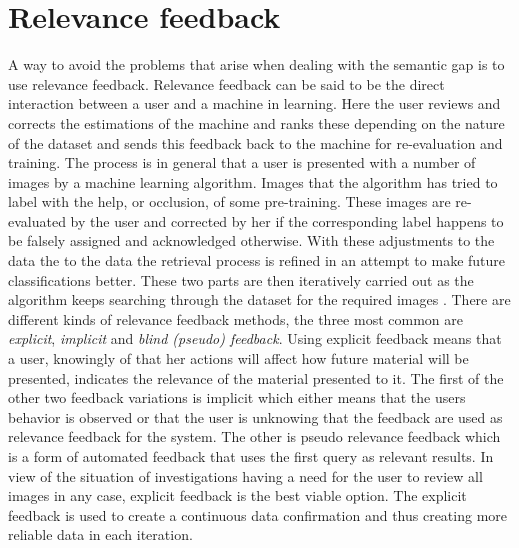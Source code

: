 \section{Relevance feedback}
\label{sec:theory:relfeed}
A way to avoid the problems that arise when dealing with the semantic gap is to use relevance feedback. Relevance feedback can be said to be the direct interaction between a user and a machine in learning. Here the user reviews and corrects the estimations of the machine and ranks these depending on the nature of the dataset and sends this feedback back to the machine for re-evaluation and training. The process is in general that a user is presented with a number of images by a machine learning algorithm. Images that the algorithm has tried to label with the help, or occlusion, of some pre-training. These images are re-evaluated by the user and corrected by her if the corresponding label happens to be falsely assigned and acknowledged otherwise. With these adjustments to the data the to the data the retrieval process is refined in an attempt to make future classifications better. These two parts are then iteratively carried out as the algorithm keeps searching through the dataset for the required images \cite{IRJET2017relevancefeedback}. There are different kinds of relevance feedback methods, the three most common are \emph{explicit}, \emph{implicit} and \emph{blind (pseudo) feedback}. Using explicit feedback means that a user, knowingly of that her actions will affect how future material will be presented, indicates the relevance of the material presented to it. The first of the other two feedback variations is implicit which either means that the users behavior is observed or that the user is unknowing that the feedback are used as relevance feedback for the system. The other is pseudo relevance feedback which is a form of automated feedback that uses the first query as relevant results. In view of the situation of investigations having a need for the user to review all images in any case, explicit feedback is the best viable option. The explicit feedback is used to create a continuous data confirmation and thus creating more reliable data in each iteration.


